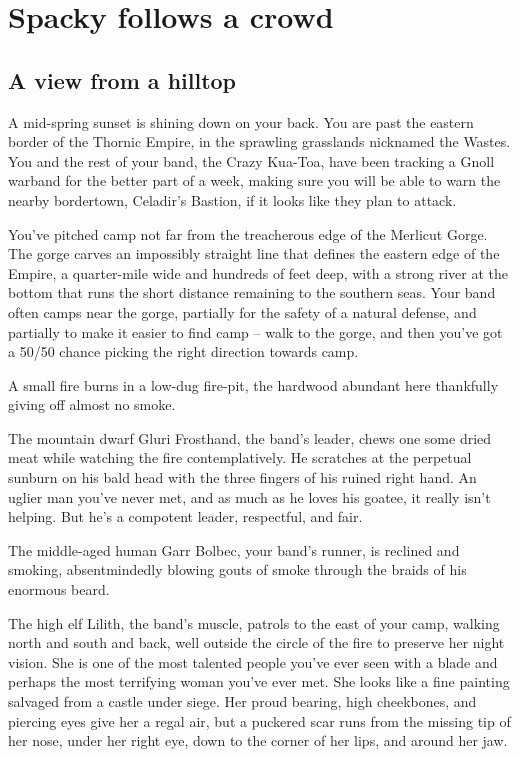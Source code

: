 
\section{Spacky follows a crowd}
\subsection{A view from a hilltop}
\begin{aloud}
  A mid-spring sunset is shining down on your back.
  You are past the eastern border of the Thornic Empire, in the sprawling grasslands
  nicknamed the Wastes.
  You and the rest of your band, the Crazy Kua-Toa, have been tracking a Gnoll warband for the
  better part of a week, making sure you will be able to warn the nearby bordertown,
  Celadir's Bastion, if it looks like they plan to attack.
\end{aloud}

You've pitched camp not far from the treacherous edge of the Merlicut Gorge.
The gorge carves an impossibly straight line that defines the eastern edge of the Empire,
a quarter-mile wide and hundreds of feet deep, with a strong river at the bottom that runs
the short distance remaining to the southern seas.
Your band often camps near the gorge, partially for the safety of a natural defense, and partially
to make it easier to find camp -- walk to the gorge, and then you've got a 50/50 chance
picking the right direction towards camp.

A small fire burns in a low-dug fire-pit, the hardwood abundant here thankfully giving off
almost no smoke.

The mountain dwarf Gluri Frosthand, the band's leader, chews one some dried meat while watching
the fire contemplatively.
He scratches at the perpetual sunburn on his bald head with the three fingers of his ruined right
hand.
An uglier man you've never met, and as much as he loves his goatee, it really isn't helping.
But he's a compotent leader, respectful, and fair.

The middle-aged human Garr Bolbec, your band's runner, is reclined and smoking, absentmindedly
blowing gouts of smoke through the braids of his enormous beard.

The high elf Lilith, the band's muscle, patrols to the east of your camp, walking north and south
and back, well outside the circle of the fire to preserve her night vision.
She is one of the most talented people you've ever seen with a blade and perhaps the most
terrifying woman you've ever met.
She looks like a fine painting salvaged from a castle under siege.
Her proud bearing, high cheekbones, and piercing eyes give her a regal air, but a puckered scar
runs from the missing tip of her nose, under her right eye, down to the corner of her lips,
and around her jaw.

